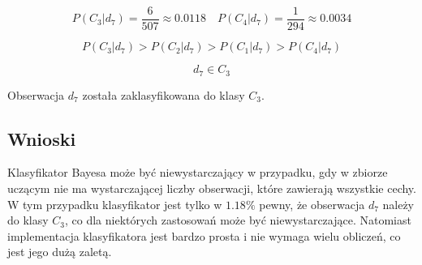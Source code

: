 \documentclass{article}
\begin{document}
\begin{equation*}
    P(C_3|d_7) = \frac{6}{507} \approx 0.0118 \quad P(C_4|d_7) = \frac{1}{294} \approx 0.0034
\end{equation*}

\begin{equation*}
    P(C_3|d_7) > P(C_2|d_7) > P(C_1|d_7) > P(C_4|d_7)
\end{equation*}

\begin{equation*}
    d_7 \in C_3
\end{equation*}

Obserwacja $d_7$ została zaklasyfikowana do klasy $C_3$.

\subsection{Wnioski}

Klasyfikator Bayesa może być niewystarczający w przypadku, gdy w zbiorze uczącym
nie ma wystarczającej liczby obserwacji, które zawierają wszystkie cechy. W tym przypadku
klasyfikator jest tylko w $1.18\%$ pewny, że obserwacja $d_7$ należy do klasy $C_3$,
co dla niektórych zastosowań może być niewystarczające. Natomiast implementacja
klasyfikatora jest bardzo prosta i nie wymaga wielu obliczeń, co jest jego dużą zaletą.
\end{document}
